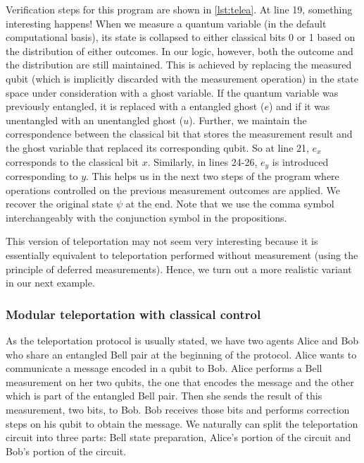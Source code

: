 \documentclass[adraft,creativecommons]{eptcs}
\theoremstyle{definition}
\theoremstyle{remark}
\begin{document}
Verification steps for this program are shown in \cref{lst:telea}. At line 19, something interesting happens! When we measure a quantum variable (in the default computational basis), its state is collapsed to either classical bits 0 or 1 based on the distribution of either outcomes. In our logic, however, both the outcome and the distribution are still maintained. This is achieved by replacing the measured qubit (which is implicitly discarded with the measurement operation) in the state space under consideration with a ghost variable. If the quantum variable was previously entangled, it is replaced with a entangled ghost ($e$) and if it was unentangled with an unentangled ghost ($u$). Further, we maintain the correspondence between the classical bit that stores the measurement result and the ghost variable that replaced its corresponding qubit. So at line 21, $e_x$ corresponds to the classical bit $x$. Similarly, in lines 24-26, $e_y$ is introduced corresponding to $y$. This helps us in the next two steps of the program where operations controlled on the previous measurement outcomes are applied. We recover the original state $\psi$ at the end. Note that we use the comma symbol interchangeably with the conjunction symbol in the propositions.

This version of teleportation may not seem very interesting because it is essentially equivalent to teleportation performed without measurement (using the principle of deferred measurements). Hence, we turn out a more realistic variant in our next example.

\subsubsection{Modular teleportation with classical control}

As the teleportation protocol is usually stated, we have two agents Alice and Bob who share an entangled Bell pair at the beginning of the protocol. Alice wants to communicate a message encoded in a qubit to Bob. Alice performs a Bell measurement on her two qubits, the one that encodes the message and the other which is part of the entangled Bell pair. Then she sends the result of this measurement, two bits, to Bob. Bob receives those bits and performs correction steps on his qubit to obtain the message. We naturally can split the teleportation circuit into three parts: Bell state preparation, Alice's portion of the circuit and Bob's portion of the circuit.
\end{document}
